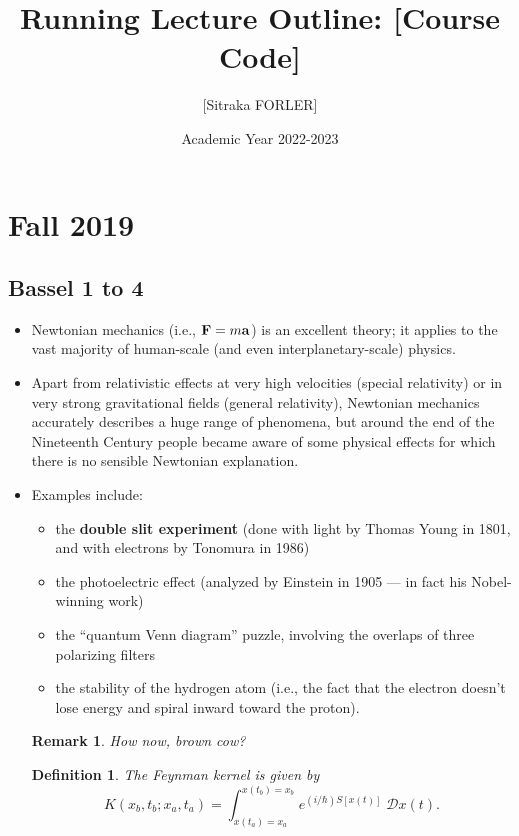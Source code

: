 \documentclass[10pt, oneside]{article}
\title{Running Lecture Outline: [Course Code]}
\author{[Sitraka FORLER]}
\date{Academic Year 2022-2023}
\newtheorem{defn}{Definition}
\newtheorem{rem}{Remark}
\begin{document}
\maketitle
\tableofcontents

\vspace{.25in}

\section{Fall 2019}

\subsection{Bassel 1 to 4 }

\begin{itemize}

\item Newtonian mechanics (i.e., ${\bf F} = m{\bf a}$) is an excellent theory; it applies to the vast majority of human-scale (and even interplanetary-scale) physics. 

\item Apart from relativistic effects at very high velocities (special relativity) or in very strong gravitational fields (general relativity), Newtonian mechanics accurately describes a huge range of phenomena, but around the end of the Nineteenth Century people became aware of some physical effects for which there is no sensible Newtonian explanation.

\item Examples include:
\begin{itemize}
\item the {\bf double slit experiment} (done with light by Thomas Young in 1801, and with electrons by Tonomura in 1986)
\item the photoelectric effect (analyzed by Einstein in 1905 --- in fact his Nobel-winning work)
\item the ``quantum Venn diagram'' puzzle, involving the overlaps of three polarizing filters
\item the stability of the hydrogen atom (i.e., the fact that the electron doesn't lose energy and spiral inward toward the proton).
\end{itemize}

\begin{rem}
How now, brown cow?
\end{rem}

\begin{defn}
The {\em Feynman kernel} is given by
\[ K(x_b, t_b; x_a, t_a) = \int_{x(t_a) = x_a}^{x(t_b) = x_b} e^{(i/\hbar) S[x(t)]} \; \mathcal{D}x(t). \]
\end{defn}

\end{itemize}
\end{document}
